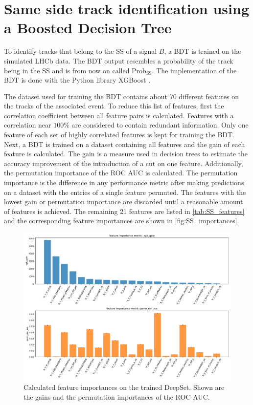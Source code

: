 \section{Same side track identification using a Boosted Decision Tree}

To identify tracks that belong to the SS of a signal $B$, a BDT is trained on the simulated LHCb data. 
The BDT output resembles a probability of the track being in the SS and is from now on called $\text{Prob}_\text{SS}$.
The implementation of the BDT is done with the Python library XGBoost \cite{xgboost}.

The dataset used for training the BDT contains about 70 different features on the tracks of the associated event.
To reduce this list of features, first the correlation coefficient between all feature pairs is calculated.
Features with a correlation near $100\%$ are considered to contain redundant information.
Only one feature of each set of highly correlated features is kept for training the BDT.
Next, a BDT is trained on a dataset containing all features and the gain of each feature is calculated.
The gain is a measure used in decision trees to estimate the accuracy improvement of the introduction of a cut on one feature.
Additionally, the permutation importance of the ROC AUC is calculated.
The permutation importance is the difference in any performance metric after making predictions on a dataset with the entries of a single feature permuted.
The features with the lowest gain or permutation importance are discarded until a reasonable amount of features is achieved.
The remaining 21 features are listed in \autoref{tab:SS_features} and the corresponding feature importances are shown in \autoref{fig:SS_importances}.

\begin{figure}
    \centering
    \includegraphics[width=\textwidth]{images/SS_feature_importances.pdf}
    \caption{Calculated feature importances on the trained DeepSet. Shown are the gains and the permutation importances of the ROC AUC.}
    \label{fig:SS_importances}
\end{figure}

